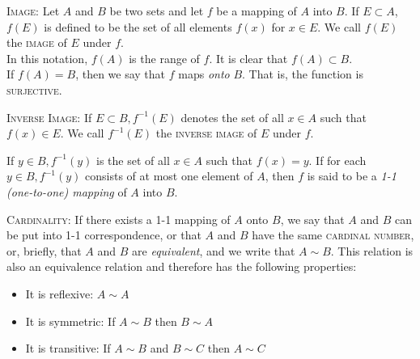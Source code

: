\begin{definition}\textsc{Image:}  Let $A$ and $B$ be two sets and let $f$ be a mapping of $A$ into $B$.   If $E \subset A$,  $f(E)$ is defined to be the set of all elements $f(x)$ for $x \in E$.   We call $f(E)$ the \textsc{image} of $E$ under $f$.  \\In this notation, $f(A)$ is the range of $f$.  It is clear that $f(A) \subset B$.  \\If $f(A) = B$, then we say that $f$ maps \emph{onto} $B$.  That is, the function is \textsc{surjective}.\end{definition}
\bigskip


\begin{definition}\textsc{Inverse Image:}  If $E \subset B, f^{-1}(E)$ denotes the set of all $x \in A$ such that $f(x) \in E$.  We call $f^{-1}(E)$ the \textsc{inverse image} of $E$ under $f$.  \\


If $y \in B, f^{-1}(y)$ is the set of all $x\in A$ such that $f(x) = y$.  If for each $y \in B, f^{-1}(y)$ consists of at most one element of $A$, then $f$ is said to be a \emph{1-1 (one-to-one) mapping} of $A$ into $B$. \end{definition}
\bigskip


\begin{definition}\textsc{Cardinality:}  If there exists a 1-1 mapping of $A$ onto $B$, we say that $A$ and $B$ can be put into 1-1 correspondence, or that $A$ and $B$ have the same \textsc{cardinal number}, or, briefly, that $A$ and $B$ are \emph{equivalent}, and we write that $A \sim B $.  This relation is also an equivalence relation and therefore has the following properties:
	\begin{itemize}
	\item It is reflexive:  $A \sim A$
	\item It is symmetric:  If $A \sim B$ then $B \sim A$
	\item It is transitive:  If $A \sim B$ and $B\sim C$ then $A \sim C$
\end{itemize}\end{definition}
\bigskip


